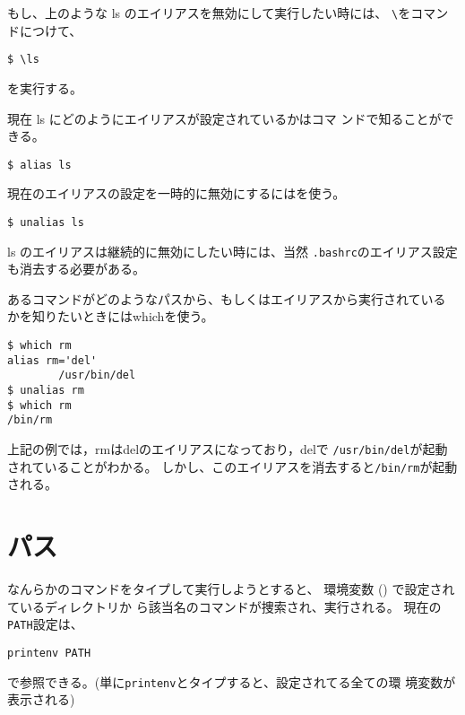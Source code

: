 \documentclass{jreport}
\begin{document}
もし、上のような ls のエイリアスを無効にして実行したい時には、
\verb|\|をコマンドにつけて、
\begin{screen}
\begin{verbatim}
$ \ls
\end{verbatim}
\end{screen}
を実行する。

現在 ls にどのようにエイリアスが設定されているかはコマ
ンドで知ることができる。
\begin{screen}
\begin{verbatim}
$ alias ls
\end{verbatim}
\end{screen}

現在のエイリアスの設定を一時的に無効にするにはを使う。
\begin{screen}
\begin{verbatim}
$ unalias ls
\end{verbatim}
\end{screen}
ls のエイリアスは継続的に無効にしたい時には、当然
\verb|.bashrc|のエイリアス設定も消去する必要がある。

あるコマンドがどのようなパスから、もしくはエイリアスから実行されている
かを知りたいときにはwhichを使う。
\begin{screen}
\begin{verbatim}
$ which rm
alias rm='del'
        /usr/bin/del
$ unalias rm
$ which rm
/bin/rm
\end{verbatim}
\end{screen}
上記の例では，rmはdelのエイリアスになっており，delで
\verb|/usr/bin/del|が起動されていることがわかる。
しかし、このエイリアスを消去すると\verb|/bin/rm|が起動される。

\section{パス}

なんらかのコマンドをタイプして実行しようとすると、
環境変数 () で設定されているディレクトリか
ら該当名のコマンドが捜索され、実行される。
現在の\verb|PATH|設定は、
\begin{screen}
\begin{verbatim}
printenv PATH
\end{verbatim}
\end{screen}
で参照できる。(単に\verb|printenv|とタイプすると、設定されてる全ての環
境変数が表示される)
\end{document}
